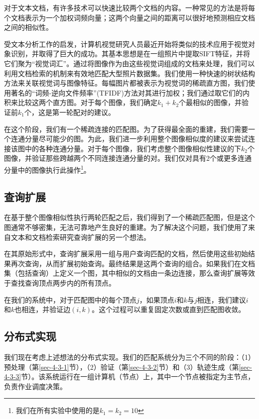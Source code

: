 \begin{translation}
对于文本文档，有许多技术可以快速比较两个文档的内容。一种常见的方法是将每个文档表示为一个加权词频向量\cite{jones1972statistical}；这两个向量之间的距离可以很好地预测相应文档之间的相似性。

受文本分析工作的启发，计算机视觉研究人员最近开始将类似的技术应用于视觉对象识别，并取得了巨大的成功\cite{chum2007total, nister2006scalable, schindler2007city, sivic2003video}。其基本思想是在一组照片中提取SIFT特征，并将它们聚为“视觉词汇”。通过将图像作为由这些视觉词组成的文档来处理，我们可以利用文档检索的机制来有效地匹配大型照片数据集。我们使用一种快速的树状结构方法来关联视觉词与图像特征\cite{nister2006scalable}。每幅图片都被表示为视觉词的稀疏直方图，我们使用著名的“词频-逆向文件频率”(TFIDF)方法对其进行加权\cite{jones1972statistical}；我们通过取它们的内积来比较这两个直方图。对于每个图像，我们确定$k_1+k_2$个最相似的图像，并验证前$k_1$个，这是第一轮配对的建议。

在这个阶段，我们有一个稀疏连接的匹配图。为了获得最全面的重建，我们需要一个连通分量尽可能少的图。为此，我们进一步利用整个图像相似度的建议来尝试连接该图中的各种连通分量。对于每个图像，我们考虑整个图像相似性建议的下$k_2$个图像，并验证那些跨越两个不同连接连通分量的对。我们仅对具有2个或更多连通分量中的图像执行此操作\footnote{我们在所有实验中使用的是$k_1=k_2=10$}。

\subsection{查询扩展}
\label{sec-4-2}
在基于整个图像相似性执行两轮匹配之后，我们得到了一个稀疏匹配图，但是这个图通常不够密集，无法可靠地产生良好的重建。为了解决这个问题，我们使用了来自文本和文档检索研究查询扩展的另一个想法\cite{chum2007total}。

在其原始形式中，查询扩展采用一组与用户查询匹配的文档，然后使用这些初始结果再次查询，从而扩展初始查询。最终结果是这两个查询的组合。如果我们在文档集（包括查询）上定义一个图，其中相似的文档由一条边连接，那么查询扩展等效于查找查询顶点两步内的所有顶点。

在我们的系统中，对于匹配图中的每个顶点$j$，如果顶点$i$和$k$与$j$相连，我们建议$i$和$k$也相连，并验证边$(i,k)$。这个过程可以重复固定次数或直到匹配图收敛。

\subsection{分布式实现}
\label{sec-4-3}
我们现在考虑上述想法的分布式实现。我们的匹配系统分为三个不同的阶段：（1）预处理（第\ref{sec-4-3-1}节），（2）验证（第\ref{sec-4-3-2}节）和（3）轨迹生成（第\ref{sec-4-3-3}节）。该系统运行在一组计算机（节点）上，其中一个节点被指定为主节点，负责作业调度决策。

\end{translation}

